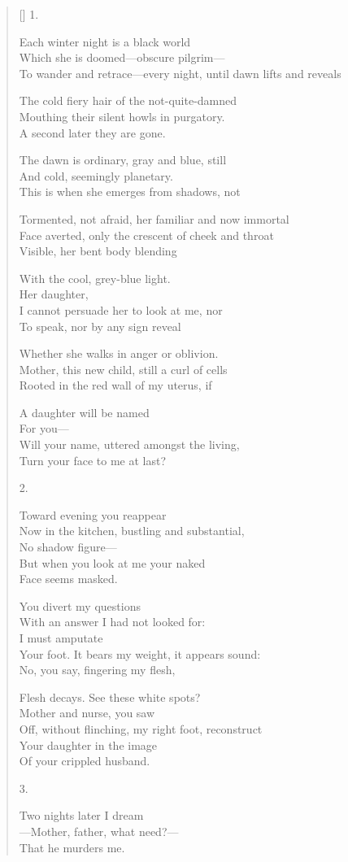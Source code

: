 \label{ch:threedreams}
\settowidth{\versewidth}{To wander and retrace---every night, until dawn lifts and reveals}
\begin{verse}[\versewidth]
1.

Each winter night is a black world\\
Which she is doomed---obscure pilgrim---\\
To wander and retrace---every night, until dawn lifts and reveals

The cold fiery hair of the not-quite-damned\\
Mouthing their silent howls in purgatory.\\
	A second later they are gone.

The dawn is ordinary, gray and blue, still\\
And cold, seemingly planetary.\\
This is when she emerges from shadows, not 

Tormented, not afraid, her familiar and now immortal\\
Face averted, only the crescent of cheek and throat\\
Visible, her bent body blending

With the cool, grey-blue light.\\
\hfill Her daughter,\\
I cannot persuade her to look at me, nor\\
To speak, nor by any sign reveal

Whether she walks in anger or oblivion.\\
Mother, this new child, still a curl of cells\\
Rooted in the red wall of my uterus, if

A daughter will be named\\
For you---\\
\hfill Will your name, uttered amongst the living,\\
Turn your face to me at last?

2.

Toward evening you reappear\\
Now in the kitchen, bustling and substantial,\\
No shadow figure---\\
But when you look at me your naked \\
Face seems masked.

You divert my questions\\
With an answer I had not looked for:\\
I must amputate \\
Your foot. It bears my weight, it appears sound:\\
No, you say, fingering my flesh,

Flesh decays. See these white spots?\\
Mother and nurse, you saw\\
Off, without flinching, my right foot, reconstruct\\
Your daughter in the image\\
Of your crippled husband.

3.

Two nights later I dream\\
---Mother, father, what need?---\\
That he murders me.
\end{verse}
